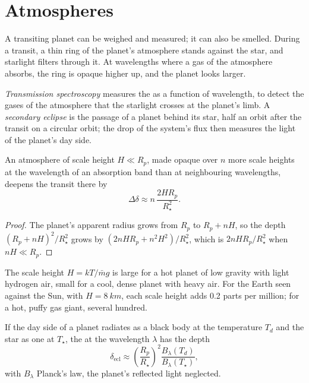 \section{Atmospheres}\label{sec:b3:exoplanets:atmospheres}

A transiting planet can be weighed and measured; it can also be smelled.
During a transit, a thin ring of the planet's atmosphere stands against
the star, and starlight filters through it. At wavelengths where a gas
of the atmosphere absorbs, the ring is opaque higher up, and the planet
looks larger.

\begin{definition}\label{def:b3:exoplanets:transmission}
\emph{Transmission spectroscopy} measures
the  as a function of wavelength, to detect the gases of the
atmosphere that the starlight crosses at the planet's limb. A
\emph{secondary eclipse} is the passage of a
planet behind its star, half an orbit after the transit on a circular
orbit; the drop of the system's flux then measures the light of the
planet's day side.
\end{definition}

\begin{proposition}\label{prop:b3:exoplanets:transmission}
An atmosphere of scale height $H \ll R_p$, made opaque over $n$ more
scale heights at the wavelength of an absorption band than at
neighbouring wavelengths, deepens the transit there by
\[
\Delta\delta \approx n\,\frac{2HR_p}{R_\star^2} .
\]
\end{proposition}

\begin{proof}
The planet's apparent radius grows from $R_p$ to $R_p + nH$, so the
depth $(R_p + nH)^2/R_\star^2$ grows by $(2nHR_p + n^2H^2)/R_\star^2$,
which is $2nHR_p/R_\star^2$ when $nH \ll R_p$.
\end{proof}

The scale height $H = kT/\bar m g$ is large for a hot planet of low
gravity with light hydrogen air, small for a cool, dense planet with
heavy air. For the Earth seen against the Sun, with $H = \qty{8}{km}$,
each scale height adds 0.2 parts per million; for a hot, puffy gas giant,
several hundred.

\begin{proposition}\label{prop:b3:exoplanets:eclipse}
If the day side of a planet radiates as a black body at the temperature
$T_d$ and the star as one at $T_\star$, the  at the
wavelength $\lambda$ has the depth
\[
\delta_\mathrm{ecl} \approx \left(\frac{R_p}{R_\star}\right)^2
  \frac{B_\lambda(T_d)}{B_\lambda(T_\star)},
\]
with $B_\lambda$ Planck's law, the planet's reflected light neglected.
\end{proposition}


